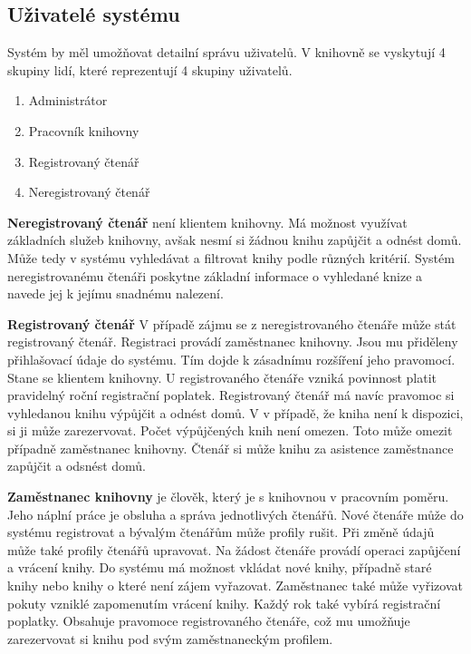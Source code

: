 \documentclass[11pt, a4paper, titlepage]{article}
\begin{document}
	\subsection*{Uživatelé systému}

	Systém by měl umožňovat detailní správu uživatelů. V knihovně se vyskytují 4 skupiny 
	lidí, které reprezentují 4 skupiny uživatelů.

	\begin{enumerate}
		\item Administrátor
		\item Pracovník knihovny
		\item Registrovaný čtenář
		\item Neregistrovaný čtenář
	\end{enumerate}

	\textbf{Neregistrovaný čtenář} není klientem knihovny. Má možnost využívat základních služeb 
	knihovny, avšak nesmí si žádnou knihu zapůjčit a odnést domů. Může tedy v systému
	vyhledávat a filtrovat knihy podle různých kritérií. Systém neregistrovanému čtenáři 
	poskytne základní informace o vyhledané knize a navede jej k jejímu snadnému nalezení.

	\textbf{Registrovaný čtenář} V případě zájmu se z neregistrovaného čtenáře může stát
	registrovaný čtenář. Registraci provádí zaměstnanec knihovny. Jsou mu přiděleny přihlašovací
	údaje do systému. Tím dojde k zásadnímu rozšíření jeho pravomocí.
	Stane se klientem knihovny. U registrovaného čtenáře vzniká povinnost platit pravidelný roční
	registrační poplatek. Registrovaný čtenář má navíc pravomoc si vyhledanou knihu výpůjčit a 		odnést domů. V
	v případě, že kniha není k dispozici, si ji může zarezervovat. Počet výpůjčených knih není omezen.
	Toto může omezit případně zaměstnanec knihovny. Čtenář si může knihu za asistence zaměstnance zapůjčit a
	odsnést domů.

	\textbf{Zaměstnanec knihovny} je člověk, který je s knihovnou v pracovním poměru. Jeho náplní
	práce je obsluha a správa jednotlivých čtenářů. Nové čtenáře může do systému registrovat a
	bývalým čtenářům může profily rušit. Při změně údajů může také profily čtenářů upravovat. Na
	žádost čtenáře provádí operaci zapůjčení a vrácení knihy. Do systému má možnost vkládat nové 		knihy, případně staré knihy nebo knihy o které není zájem vyřazovat. Zaměstnanec také může
	vyřizovat pokuty vzniklé zapomenutím vrácení knihy. Každý rok také vybírá registrační poplatky.
	Obsahuje pravomoce registrovaného čtenáře, což mu umožňuje zarezervovat si knihu pod svým
	zaměstnaneckým profilem.
\end{document}
